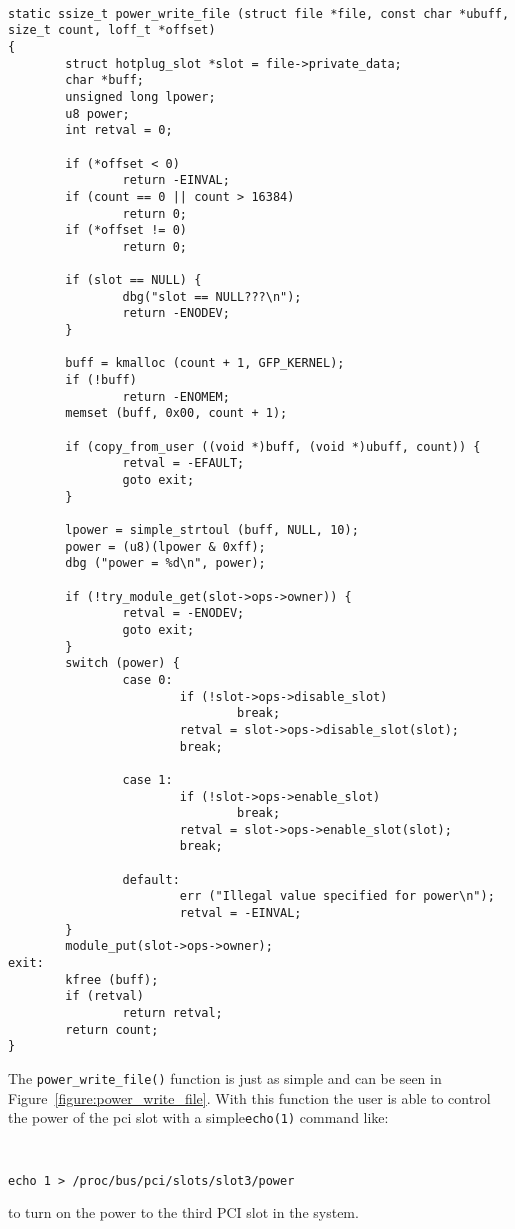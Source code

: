 \documentclass[twocolumn]{article}
\begin{document}
\begin{figure*}[tb]
{\tt \small
\begin{verbatim}
static ssize_t power_write_file (struct file *file, const char *ubuff, size_t count, loff_t *offset)
{
        struct hotplug_slot *slot = file->private_data;
        char *buff;
        unsigned long lpower;
        u8 power;
        int retval = 0;

        if (*offset < 0)
                return -EINVAL;
        if (count == 0 || count > 16384)
                return 0;
        if (*offset != 0)
                return 0;

        if (slot == NULL) {
                dbg("slot == NULL???\n");
                return -ENODEV;
        }

        buff = kmalloc (count + 1, GFP_KERNEL);
        if (!buff)
                return -ENOMEM;
        memset (buff, 0x00, count + 1);

        if (copy_from_user ((void *)buff, (void *)ubuff, count)) {
                retval = -EFAULT;
                goto exit;
        }

        lpower = simple_strtoul (buff, NULL, 10);
        power = (u8)(lpower & 0xff);
        dbg ("power = %d\n", power);

        if (!try_module_get(slot->ops->owner)) {
                retval = -ENODEV;
                goto exit;
        }
        switch (power) {
                case 0:
                        if (!slot->ops->disable_slot)
                                break;
                        retval = slot->ops->disable_slot(slot);
                        break;

                case 1:
                        if (!slot->ops->enable_slot)
                                break;
                        retval = slot->ops->enable_slot(slot);
                        break;

                default:
                        err ("Illegal value specified for power\n");
                        retval = -EINVAL;
        }
        module_put(slot->ops->owner);
exit:
        kfree (buff);
        if (retval)
                return retval;
        return count;
}
\end{verbatim}
}
\caption{\footnotesize{
{\tt power\_write\_file} from {\tt drivers/hotplug/pci\_hotplug\_core.c}}}
\label{figure:power_write_file}
\end{figure*}

The {\tt power\_write\_file()} function is just as simple and can be seen in 
Figure~\ref{figure:power_write_file}.
With this function the user is able to control the power of the pci slot
with a simple{\tt echo(1)} command like:
{\tt \small
\begin{verbatim}
echo 1 > /proc/bus/pci/slots/slot3/power
\end{verbatim}
}
to turn on the power to the third PCI slot in the system.
\end{document}
